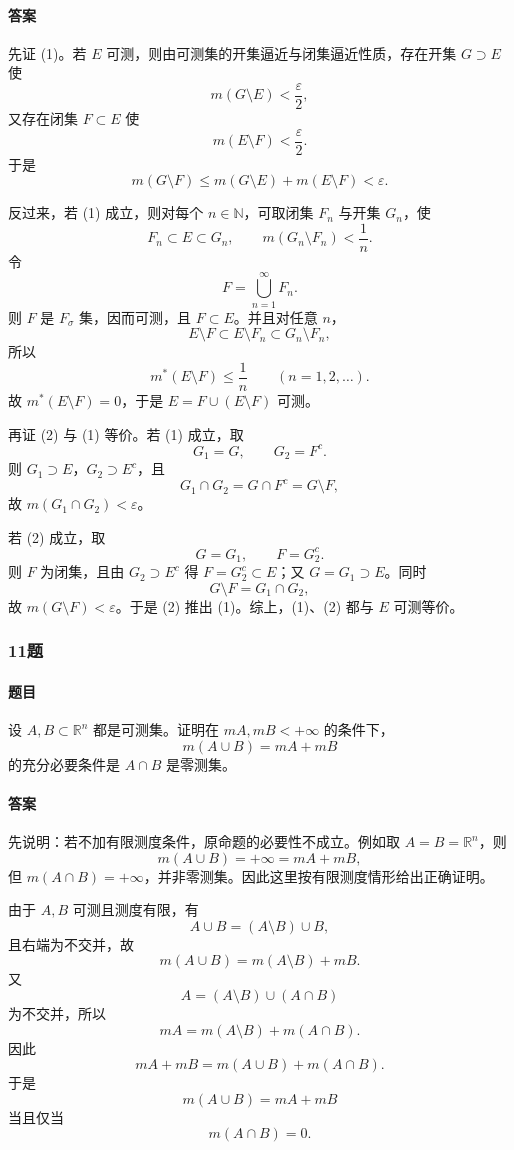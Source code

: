 \documentclass{article}
\newcommand{\eps}{\varepsilon}
\begin{document}
\paragraph{答案} 先证 (1)。若 $E$ 可测，则由可测集的开集逼近与闭集逼近性质，存在开集 $G\supset E$ 使
\[
 m(G\setminus E)<\frac{\eps}{2},
\]
又存在闭集 $F\subset E$ 使
\[
 m(E\setminus F)<\frac{\eps}{2}.
\]
于是
\[
 m(G\setminus F)\le m(G\setminus E)+m(E\setminus F)<\eps.
\]

反过来，若 (1) 成立，则对每个 $n\in\mathbb{N}$，可取闭集 $F_n$ 与开集 $G_n$，使
\[
 F_n\subset E\subset G_n,\qquad m(G_n\setminus F_n)<\frac1n.
\]
令
\[
 F=\bigcup_{n=1}^{\infty}F_n.
\]
则 $F$ 是 $F_\sigma$ 集，因而可测，且 $F\subset E$。并且对任意 $n$，
\[
 E\setminus F\subset E\setminus F_n\subset G_n\setminus F_n,
\]
所以
\[
 m^*(E\setminus F)\le \frac1n\qquad(n=1,2,\ldots).
\]
故 $m^*(E\setminus F)=0$，于是 $E=F\cup(E\setminus F)$ 可测。

再证 (2) 与 (1) 等价。若 (1) 成立，取
\[
 G_1=G,
\qquad
 G_2=F^c.
\]
则 $G_1\supset E$，$G_2\supset E^c$，且
\[
 G_1\cap G_2=G\cap F^c=G\setminus F,
\]
故 $m(G_1\cap G_2)<\eps$。

若 (2) 成立，取
\[
 G=G_1,
\qquad
 F=G_2^c.
\]
则 $F$ 为闭集，且由 $G_2\supset E^c$ 得 $F=G_2^c\subset E$；又 $G=G_1\supset E$。同时
\[
 G\setminus F=G_1\cap G_2,
\]
故 $m(G\setminus F)<\eps$。于是 (2) 推出 (1)。综上，(1)、(2) 都与 $E$ 可测等价。

\subsubsection*{11题}
\paragraph{题目} 设 $A,B\subset\mathbb{R}^n$ 都是可测集。证明在 $mA,mB<+\infty$ 的条件下，
\[
 m(A\cup B)=mA+mB
\]
的充分必要条件是 $A\cap B$ 是零测集。

\paragraph{答案} 先说明：若不加有限测度条件，原命题的必要性不成立。例如取 $A=B=\mathbb{R}^n$，则
\[
 m(A\cup B)=+\infty=mA+mB,
\]
但 $m(A\cap B)=+\infty$，并非零测集。因此这里按有限测度情形给出正确证明。

由于 $A,B$ 可测且测度有限，有
\[
 A\cup B=(A\setminus B)\cup B,
\]
且右端为不交并，故
\[
 m(A\cup B)=m(A\setminus B)+mB.
\]
又
\[
 A=(A\setminus B)\cup(A\cap B)
\]
为不交并，所以
\[
 mA=m(A\setminus B)+m(A\cap B).
\]
因此
\[
 mA+mB=m(A\cup B)+m(A\cap B).
\]
于是
\[
 m(A\cup B)=mA+mB
\]
当且仅当
\[
 m(A\cap B)=0.
\]
\end{document}
